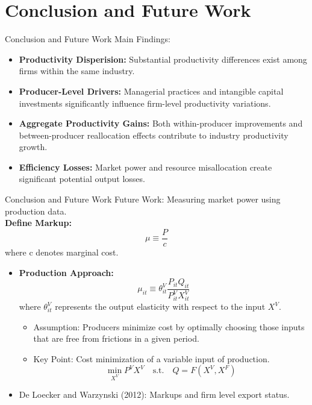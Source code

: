 \documentclass[aspectratio=169]{beamer}  %
\begin{document}
\section{Conclusion and Future Work}
\begin{frame}{Conclusion and Future Work}
    Main Findings:
    \begin{itemize}
        \item \textbf{Productivity Disperision:} Substantial productivity differences exist among firms within the same industry.
        \item \textbf{Producer-Level Drivers:} Managerial practices and intangible capital investments significantly influence firm-level productivity variations.
        \item \textbf{Aggregate Productivity Gains:} Both within-producer improvements and between-producer reallocation effects contribute to industry productivity growth.
        \item \textbf{Efficiency Losses:} Market power and resource misallocation create significant potential output losses.
    \end{itemize}
\end{frame}



\begin{frame}{Conclusion and Future Work}
    Future Work: Measuring market power using production data.\\
    \textbf{Define Markup:}
    \[
    \mu \equiv \frac{P}{c}
    \]
    where c denotes marginal cost.
    \begin{itemize}
        \item \textbf{Production Approach:}
        \[
        \mu_{it} \equiv \theta_{it}^V \frac{P_{it} Q_{it}}{P_{it}^V X_{it}^V}
        \]
        where \(\theta_{it}^V\) represents the output elasticity with respect to the input \(X^V\).
        \begin{itemize}
            \item Assumption: Producers minimize cost by optimally choosing those inputs that are free from frictions in a given period.
            \item Key Point: Cost minimization of a variable input of production.
            \[
            \min_{X^V} P^V X^V \quad \text{s.t.} \quad Q = F(X^V, X^F)
            \]
        \end{itemize}
        \item De Loecker and Warzynski (2012): Markups and firm level export status.
    \end{itemize}
\end{frame}
\end{document}

